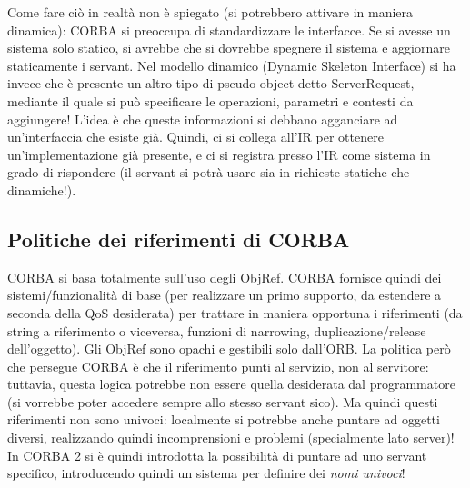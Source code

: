 Come fare ciò in realtà non è spiegato (si potrebbero attivare in maniera dinamica): CORBA si preoccupa di
standardizzare le interfacce. Se si avesse un sistema solo statico, si avrebbe che si dovrebbe spegnere il sistema e
aggiornare staticamente i servant.
Nel modello dinamico (Dynamic Skeleton Interface) si ha invece che è presente un altro tipo di pseudo-object detto
ServerRequest, mediante il quale si può specificare le operazioni, parametri e contesti da aggiungere! L'idea è che
queste informazioni si debbano agganciare ad un'interfaccia che esiste già. Quindi, ci si collega all'IR per ottenere
un'implementazione già presente, e ci si registra presso l'IR come sistema in grado di rispondere (il servant si potrà
usare sia in richieste statiche che dinamiche!).
\subsection{Politiche dei riferimenti di CORBA}
CORBA si basa totalmente sull'uso degli ObjRef. CORBA fornisce quindi dei sistemi/funzionalità di base (per realizzare
un primo supporto, da estendere a seconda della QoS desiderata) per trattare in maniera opportuna i riferimenti
(da string a riferimento o viceversa, funzioni di narrowing, duplicazione/release dell'oggetto). Gli ObjRef sono opachi
e gestibili solo dall'ORB.
La politica però che persegue CORBA è che il riferimento punti al servizio, non al servitore: tuttavia, questa logica
potrebbe non essere quella desiderata dal programmatore (si vorrebbe poter accedere sempre allo stesso servant
sico). Ma quindi questi riferimenti non sono univoci: localmente si potrebbe anche puntare ad oggetti diversi,
realizzando quindi incomprensioni e problemi (specialmente lato server)!
In CORBA 2 si è quindi introdotta la possibilità di puntare ad uno servant specifico, introducendo quindi un sistema per
definire dei \textit{nomi univoci}!
